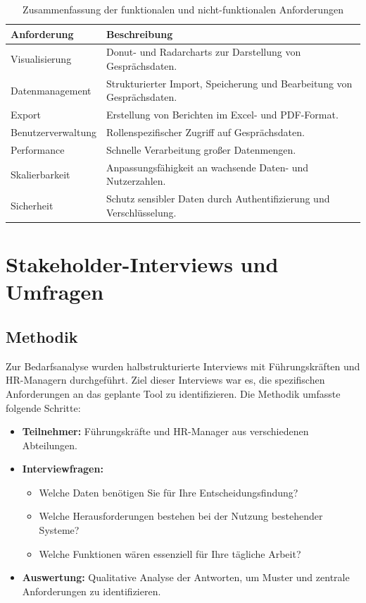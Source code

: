 \begin{table}[h!]
\centering
\caption{Zusammenfassung der funktionalen und nicht-funktionalen Anforderungen}
\label{tab:anforderungen_uebersicht}
\begin{tabularx}{\textwidth}{|X|X|}
\hline
\textbf{Anforderung}              & \textbf{Beschreibung}                                                                                                   \\\hline
Visualisierung                   & Donut- und Radarcharts zur Darstellung von Gesprächsdaten. \\\hline
Datenmanagement                  & Strukturierter Import, Speicherung und Bearbeitung von Gesprächsdaten. \\\hline
Export                           & Erstellung von Berichten im Excel- und PDF-Format. \\\hline
Benutzerverwaltung               & Rollenspezifischer Zugriff auf Gesprächsdaten. \\\hline
Performance                      & Schnelle Verarbeitung großer Datenmengen. \\\hline
Skalierbarkeit                   & Anpassungsfähigkeit an wachsende Daten- und Nutzerzahlen. \\\hline
Sicherheit                       & Schutz sensibler Daten durch Authentifizierung und Verschlüsselung. \\\hline
\end{tabularx}
\end{table}

\section{Stakeholder-Interviews und Umfragen}
\subsection{Methodik}
Zur Bedarfsanalyse wurden halbstrukturierte Interviews mit Führungskräften und HR-Managern durchgeführt. Ziel dieser Interviews war es, die spezifischen Anforderungen an das geplante Tool zu identifizieren. Die Methodik umfasste folgende Schritte:
\begin{itemize}
    \item \textbf{Teilnehmer:} Führungskräfte und HR-Manager aus verschiedenen Abteilungen.
    \item \textbf{Interviewfragen:}
    \begin{itemize}
        \item Welche Daten benötigen Sie für Ihre Entscheidungsfindung?
        \item Welche Herausforderungen bestehen bei der Nutzung bestehender Systeme?
        \item Welche Funktionen wären essenziell für Ihre tägliche Arbeit?
    \end{itemize}
    \item \textbf{Auswertung:} Qualitative Analyse der Antworten, um Muster und zentrale Anforderungen zu identifizieren.
\end{itemize}

